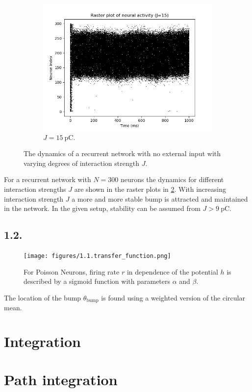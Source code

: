 \documentclass{article}
\begin{document}
\begin{figure}[h!]
\begin{subfigure}[b]{0.32\textwidth}
  \end{subfigure}
  \hfill
  \begin{subfigure}[b]{0.32\textwidth}
    \includegraphics[width=\textwidth]{figures/1.1.raster_plot_J15.png}
    \caption{\(J=\qty{15}{\pico\coulomb}\).}
    \label{fig:J15}
  \end{subfigure}
  \caption{The dynamics of a recurrent network with no external input with varying degrees of interaction strength \(J\).}
  \label{fig:J}
\end{figure}

For a recurrent network with \(N=300\) neurons the dynamics for different interaction strengths \(J\) are shown in the raster plots in \cref{fig:J}. With increasing interaction strength \(J\) a more and more stable bump is attracted and maintained in the network. In the given setup, stability can be assumed from \(J>\qty{9}{\pico\coulomb}\).

\subsection*{1.2.}
\begin{figure}[h]
    \centering
    \texttt{[image: figures/1.1.transfer\_function.png]}
    \caption{For Poisson Neurons, firing rate \(r\) in dependence of the potential \(h\) is described by a sigmoid function with parameters \(\alpha\) and \(\beta\).}
    \label{fig:01}
\end{figure}
The location of the bump \(\theta_\text{bump}\) is found using a weighted version of the circular mean.



\section{Integration}

\section{Path integration}
\end{document}
